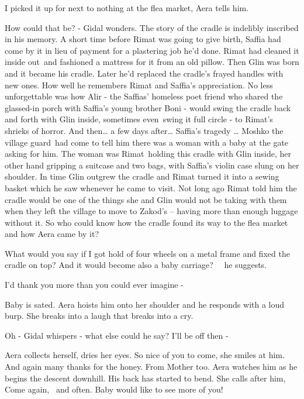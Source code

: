 \documentclass[letterpaper]{article}
\begin{document}
{\textquotedbl}I picked it up for next to nothing at the flea market,{\textquotedbl} Aera tells
him{.}

How could that be? - Gidal wonders. The story of the cradle is indelibly inscribed in his memory. A short time before
Rimat was going to give birth, Saffia had come by it in lieu of payment for a plastering
job{ }he'd done. Rimat had cleaned it inside out~and fashioned a mattress for
it from an old pillow. Then Glin was born and it became his cradle. Later he'd replaced the cradle's frayed handles
with new ones. How well he remembers Rimat and Saffia's appreciation. No less unforgettable was how Alir - the Saffias'
homeless poet friend who shared the glassed-in porch with Saffia's young brother Boni - would swing the cradle back and
forth with Glin inside, sometimes even~swing it full circle - to Rimat's shrieks of horror. And then{\dots} a few days
after{\dots} Saffia's tragedy {\dots} Moshko the village guard~had come to tell him there was a woman with a baby at
the gate asking for him. The woman was Rimat~holding this cradle with Glin inside, her other hand gripping a suitcase
and two bags, with{ }Saffia's violin case slung on her shoulder. In time Glin
outgrew the cradle and Rimat turned it into a sewing basket which he saw whenever he came to visit. Not long ago Rimat
told him the cradle would be one of the things she and Glin would not be taking with them when they left the village to
move to Zakod's {{}--} having more than enough luggage without it. So who could
know how the cradle found its way to the flea market and how Aera came by it?

{\textquotedbl}What would you say if I got hold of four wheels on a metal frame and fixed the cradle on top? And it
would become also a baby carriage?{\textquotedbl} \ \ he suggests.

{\textquotedbl}I'd thank you more than you could ever imagine -{\textquotedbl} 

Baby is sated. Aera hoists him onto her shoulder and he responds with a loud burp. She breaks into a laugh that breaks
into a cry. 

{\textquotedbl}Oh -{\textquotedbl} Gidal whispers - what else could he say? {\textquotedbl}I'll be off then
-{\textquotedbl}

Aera collects herself, dries her eyes. {\textquotedbl}So nice of you to come,{\textquotedbl} she smiles at him.
{\textquotedbl}And again many thanks for the honey. From Mother too.{\textquotedbl} Aera watches him as he begins the
descent downhill. His back has started to bend. She calls after him, {\textquotedbl}Come again, \ and often. Baby would
like to see more of you!{\textquotedbl}
\end{document}
